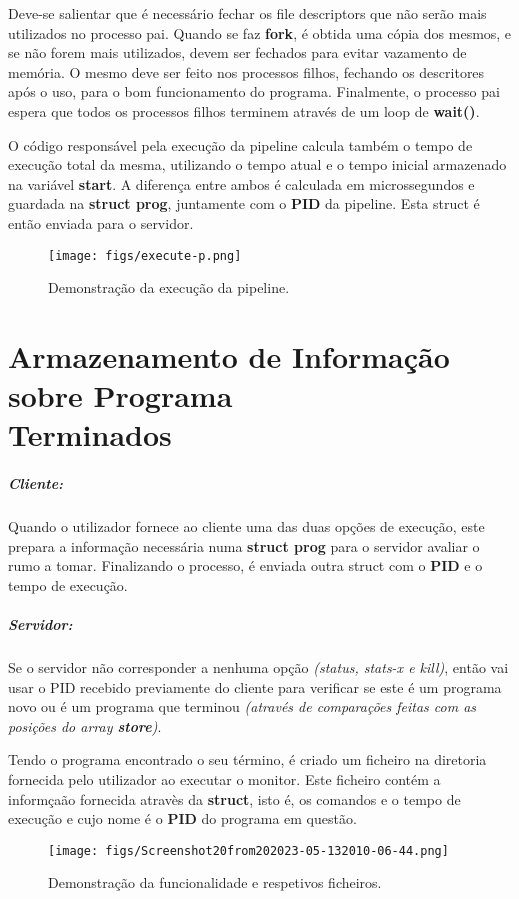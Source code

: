 \documentclass{report}
\begin{document}
Deve-se salientar que é necessário fechar os file descriptors que não serão mais utilizados no processo pai. Quando se faz \textbf{fork}, é obtida uma cópia dos mesmos, e se não forem mais utilizados, devem ser fechados para evitar vazamento de memória. O mesmo deve ser feito nos processos filhos, fechando os descritores após o uso, para o bom funcionamento do programa.
Finalmente, o processo pai espera que todos os processos filhos terminem através de um loop de \textbf{wait()}.\par
O código responsável pela execução da pipeline calcula também o tempo de execução total da mesma, utilizando o tempo atual e o tempo inicial armazenado na variável \textbf{start}. A diferença entre ambos é calculada em microssegundos e guardada na \textbf{struct prog}, juntamente com o \textbf{PID} da pipeline. Esta struct é então enviada para o servidor.

\begin{figure}[h]
    \centering
    \texttt{[image: figs/execute-p.png]}
    \caption{Demonstração da execução da pipeline.}
    \label{f}
\end{figure}

\newpage
\section{Armazenamento de Informação sobre Programa\\Terminados}

\subparagraph{Cliente:} Quando o utilizador fornece ao cliente uma das duas opções de execução, este prepara a informação necessária numa \textbf{struct prog} para o servidor avaliar o rumo a tomar. Finalizando o processo, é enviada outra struct com o \textbf{PID} e o tempo de execução.

\subparagraph{Servidor:} Se o servidor não corresponder a nenhuma opção \textit{(status, stats-x e kill)}, então vai usar o PID recebido previamente do cliente para verificar se este é um programa novo ou é um programa que terminou \textit{(através de comparações feitas com as posições do array \textbf{store})}.\par
Tendo o programa encontrado o seu término, é criado um ficheiro na diretoria fornecida pelo utilizador ao executar o monitor. Este ficheiro contém a informçaão fornecida atravès da \textbf{struct}, isto é, os comandos e o tempo de execução e cujo nome é o \textbf{PID} do programa em questão.

\begin{figure}[h]
    \centering
    \texttt{[image: figs/Screenshot20from202023-05-132010-06-44.png]}
    \caption{Demonstração da funcionalidade e respetivos ficheiros.}
    \label{f}
\end{figure}
\end{document}
